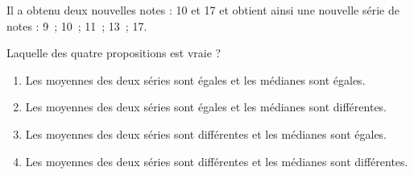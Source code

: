	Il a obtenu deux nouvelles notes : 10 et 17 et obtient ainsi une nouvelle série de notes : 9~; 10~; 11~; 13~; 17.
	
	Laquelle des quatre propositions est vraie ?
	
	\begin{enumerate}[label=\textbf{\alph* .}]
	\item Les moyennes des deux séries sont égales et les médianes sont égales.
	\item Les moyennes des deux séries sont égales et les médianes sont différentes.
	\item Les moyennes des deux séries sont différentes et les médianes sont égales.
	\item Les moyennes des deux séries sont différentes et les médianes sont différentes.
	\end{enumerate}

